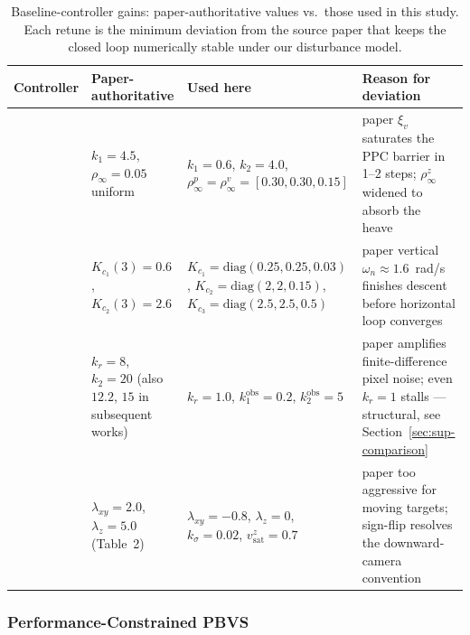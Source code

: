 \documentclass[10pt,journal]{IEEEtran}
\begin{document}
\begin{table}[!t]
\centering
\footnotesize
\caption{Baseline-controller gains: paper-authoritative values vs.\ those used in this study. Each retune is the minimum deviation from the source paper that keeps the closed loop numerically stable under our disturbance model.}
\label{baseline gains: table}
\begin{tabular}{p{} p{} p{} p{}}
\toprule
\textbf{Controller} & \textbf{Paper-authoritative} & \textbf{Used here} & \textbf{Reason for deviation} \\
\midrule
\cite{lin2022} & $k_1{=}4.5$, $\rho_\infty{=}0.05$ uniform & $k_1{=}0.6$, $k_2{=}4.0$, $\rho_\infty^p{=}\rho_\infty^v{=}[0.30,0.30,0.15]$ & paper $\xi_v$ saturates the PPC barrier in 1--2 steps; $\rho_\infty^z$ widened to absorb the~\cite{lin2022} heave \\
\cite{zhang2026} & $K_{c_1}(3){=}0.6$, $K_{c_2}(3){=}2.6$ & $K_{c_1}{=}\text{diag}(0.25,0.25,0.03)$, $K_{c_2}{=}\text{diag}(2,2,0.15)$, $K_{c_3}{=}\text{diag}(2.5,2.5,0.5)$ & paper vertical $\omega_n{\approx}1.6$~rad/s finishes descent before horizontal loop converges \\
\cite{chen2025} & $k_r{=}8$, $k_2{=}20$ (also $12.2$, $15$ in subsequent works) & $k_r{=}1.0$, $k_1^\text{obs}{=}0.2$, $k_2^\text{obs}{=}5$ & paper amplifies finite-difference pixel noise; even $k_r{=}1$ stalls --- structural, see Section~\ref{sec:sup-comparison} \\
\cite{cho2022} & $\lambda_{xy}{=}2.0$, $\lambda_z{=}5.0$ (Table~2) & $\lambda_{xy}{=}{-}0.8$, $\lambda_z{=}0$, $k_\sigma{=}0.02$, $v_\text{sat}^z{=}0.7$ & paper too aggressive for moving targets; sign-flip resolves the downward-camera convention \\
\bottomrule
\end{tabular}
\end{table}

\subsubsection{Performance-Constrained PBVS \cite{lin2022}}
\end{document}
